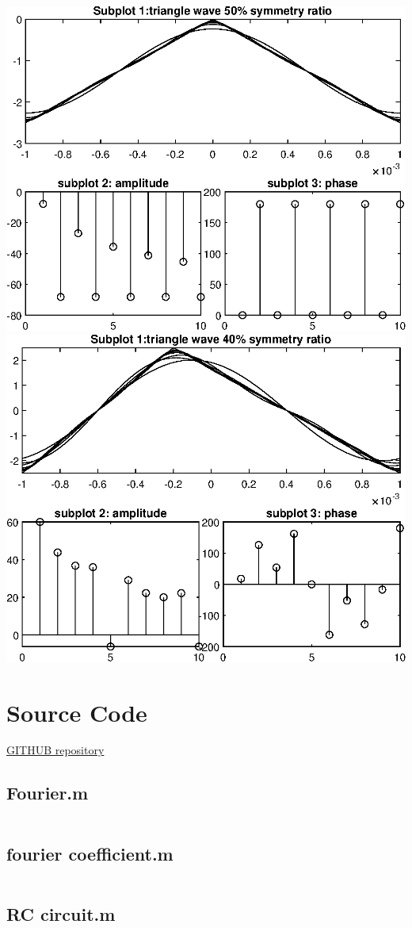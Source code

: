 \documentclass[notitlepage, a4paper, 11pt]{article}
\begin{document}
\begin{center}
		\includegraphics{../Matlab/img/tri50}
		\includegraphics{../Matlab/img/tri40}
	\end{center}
	
	\newpage
	\appendix
	\section{Source Code}\label{sec:source-code}
	\href{https://github.com/kamilix2003/CT_labs}{GITHUB repository}
	\subsection*{Fourier.m}
	\inputminted{matlab}{../Matlab/Fourier.m}
	\subsection*{fourier coefficient.m}
	\inputminted{matlab}{../Matlab/fourier_coefficient.m}
	\subsection*{RC circuit.m}
	\inputminted{matlab}{../Matlab/RC_circuit.m}
\end{document}
